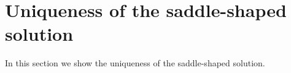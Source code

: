 \section{Uniqueness of the saddle-shaped solution}
\label{Sec:Uniqueness}

In this section we show the uniqueness of the saddle-shaped solution.






	
	
